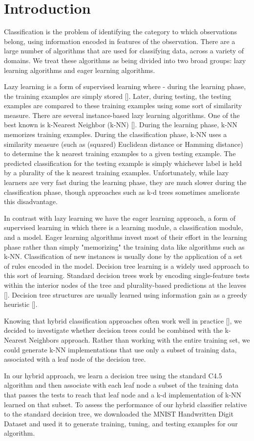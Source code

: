 \section{Introduction}
Classification is the problem of identifying the category to which observations belong, using information encoded in features of the observation. There are a large number of algorithms that are used for classifying data, across a variety of domains.  We treat these algorithms as being divided into two broad groups: lazy learning algorithms and eager learning algorithms.

  Lazy learning is a form of supervised learning where - during the learning phase, the training examples are simply stored [].  Later, during testing, the testing examples are compared to these training examples using some sort of similarity measure.  There are several instance-based lazy learning algorithms. One of the best known is k-Nearest Neighbor (k-NN) []. During the learning phase, k-NN memorizes training examples. During the classification phase, k-NN uses a similarity measure (such as (squared) Euclidean distance or Hamming distance) to determine the k nearest training examples to a given testing example.  The predicted classification for the testing example is simply whichever label is held by a plurality of the k nearest training examples.  Unfortunately, while lazy learners are very fast during the learning phase, they are much slower during the classification phase, though approaches such as k-d trees sometimes ameliorate this disadvantage.
  
   In contrast with lazy learning we have the eager learning approach, a form of supervised learning in which there is a learning module, a classification module, and a model. Eager learning algorithms invest most of their effort in the learning phase rather than simply "memorizing" the training data like algorithms such as k-NN. Classification of new instances is usually done by the application of a set of rules encoded in the model. Decision tree learning is a widely used approach to this sort of learning. Standard decision trees work by encoding single-feature tests within the interior nodes of the tree and plurality-based predictions at the leaves [].  Decision tree structures are usually learned using information gain as a greedy heuristic [].
   
  Knowing that hybrid classification approaches often work well in practice [], we decided to investigate whether decision trees could be combined with the k-Nearest Neighbors approach.  Rather than working with the entire training set, we could generate k-NN implementations that use only a subset of training data, associated with a leaf node of the decision tree.

  In our hybrid approach, we learn a decision tree using the standard C4.5 algorithm and then associate with each leaf node a subset of the training data that passes the tests to reach that leaf node and a k-d implementation of k-NN learned on that subset. To assess the performance of our hybrid classifier relative to the standard decision tree, we downloaded the MNIST Handwritten Digit Dataset \cite{MNISTDatabase} and used it to generate training, tuning, and testing examples for our algorithm.
